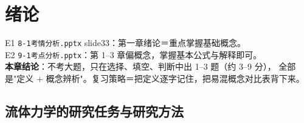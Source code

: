 \chapter{绪论}

\begin{yijubox}
E1 \texttt{8-1考情分析.pptx} slide33：第一章绪论＝重点掌握基础概念。\\
E2 \texttt{9-1考点分析.pptx}：第 1--3 章偏概念，掌握基本公式与解释即可。\\
\textbf{本章结论}：不考大题，只在选择、填空、判断中出 1--3 题（约 3--9 分），
全部是"定义 + 概念辨析"。复习策略＝把定义逐字记住，把易混概念对比表背下来。
\end{yijubox}

\section{流体力学的研究任务与研究方法}

